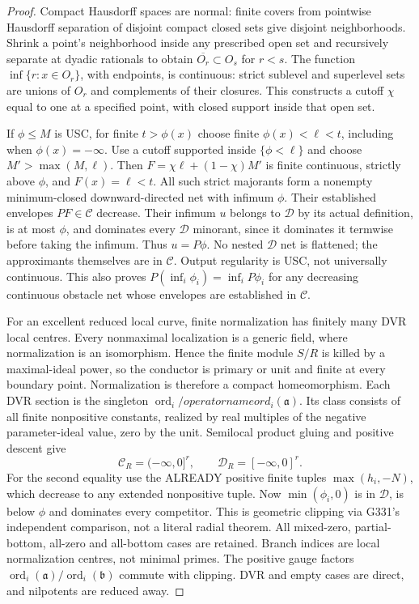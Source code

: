 \documentclass[11pt]{article}
\newcommand{\C}{\mathcal C}
\newcommand{\D}{\mathcal D}
\newcommand{\aideal}{\mathfrak a}
\begin{document}
\begin{proof}
Compact Hausdorff spaces are normal: finite covers from pointwise Hausdorff
separation of disjoint compact closed sets give disjoint neighborhoods.
Shrink a point's neighborhood inside any prescribed open set and recursively
separate at dyadic rationals to obtain $\overline{O_r}\subset O_s$ for $r<s$.
The function $\inf\{r:x\in O_r\}$, with endpoints, is continuous: strict
sublevel and superlevel sets are unions of $O_r$ and complements of their
closures. This constructs a cutoff $\chi$ equal to one at a specified point,
with closed support inside that open set.

If $\phi\le M$ is USC, for finite $t>\phi(x)$ choose finite
$\phi(x)<\ell<t$, including when $\phi(x)=-\infty$. Use a cutoff supported
inside $\{\phi<\ell\}$ and choose $M'>\max(M,\ell)$.
Then $F=\chi\ell+(1-\chi)M'$ is finite continuous, strictly above $\phi$,
and $F(x)=\ell<t$. All such strict majorants form a nonempty minimum-closed
downward-directed net with infimum $\phi$. Their established envelopes
$P F\in\C$ decrease. Their infimum $u$ belongs to $\D$ by its actual definition,
is at most $\phi$, and dominates every $\D$ minorant, since it dominates it
termwise before taking the infimum. Thus $u=P\phi$. No nested $\D$ net is
flattened; the approximants themselves are in $\C$. Output regularity is USC,
not universally continuous. This also proves $P(\inf_i\phi_i)=\inf_iP\phi_i$
for any decreasing continuous obstacle net whose envelopes are established in $\C$.

For an excellent reduced local curve, finite normalization has finitely many
DVR local centres. Every nonmaximal localization is a generic field, where
normalization is an isomorphism. Hence the finite module $S/R$ is killed by
a maximal-ideal power, so the conductor is primary or unit and finite at
every boundary point. Normalization is therefore a compact homeomorphism.
Each DVR section is the singleton $\operatorname{ord}_i/operatorname{ord}_i(\aideal)$.
Its class consists of all finite nonpositive constants, realized by real
multiples of the negative parameter-ideal value, zero by the unit.
Semilocal product gluing and positive descent give
\[
 \C_R=(-\infty,0]^r,\qquad \D_R=[-\infty,0]^r.
\]
For the second equality use the ALREADY positive finite tuples
$\max(h_i,-N)$, which decrease to any extended nonpositive tuple.
Now $\min(\phi_i,0)$ is in $\D$, is below $\phi$ and dominates every competitor.
This is geometric clipping via G331's independent comparison, not a literal
radial theorem. All mixed-zero, partial-bottom, all-zero and all-bottom cases
are retained. Branch indices are local normalization centres, not minimal
primes. The positive gauge factors $\operatorname{ord}_i(\aideal)/
\operatorname{ord}_i(\mathfrak b)$ commute with clipping. DVR and empty cases
are direct, and nilpotents are reduced away.
\end{proof}
\end{document}
